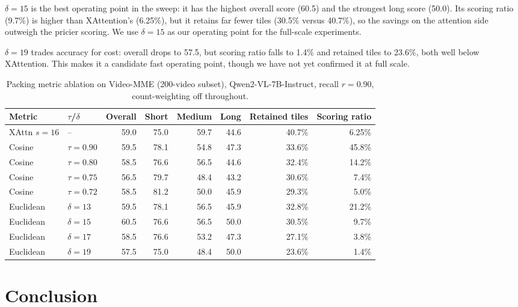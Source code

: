 $\delta{=}15$ is the best operating point in the sweep: it has the highest overall score (60.5) and the strongest long score (50.0). Its scoring ratio (9.7\%) is higher than XAttention's (6.25\%), but it retains far fewer tiles (30.5\% versus 40.7\%), so the savings on the attention side outweigh the pricier scoring. We use $\delta{=}15$ as our operating point for the full-scale experiments.

$\delta{=}19$ trades accuracy for cost: overall drops to 57.5, but scoring ratio falls to 1.4\% and retained tiles to 23.6\%, both well below XAttention. This makes it a candidate fast operating point, though we have not yet confirmed it at full scale.




\begin{table}[!ht]
\centering
\caption{Packing metric ablation on Video-MME (200-video subset), Qwen2-VL-7B-Instruct, recall $r{=}0.90$, count-weighting off throughout.}
\label{tab:videomme_ablation_metric}
\begin{tabular}{llrrrrrr}
\toprule
Metric & $\tau$/$\delta$ & Overall & Short & Medium & Long & Retained tiles & Scoring ratio \\
\midrule
XAttn $s{=}16$ & -- & 59.0 & 75.0 & 59.7 & 44.6 & 40.7\% & 6.25\% \\
\midrule
Cosine & $\tau{=}0.90$ & 59.5 & 78.1 & 54.8 & 47.3 & 33.6\% & 45.8\% \\
Cosine & $\tau{=}0.80$ & 58.5 & 76.6 & 56.5 & 44.6 & 32.4\% & 14.2\% \\
Cosine & $\tau{=}0.75$ & 56.5 & 79.7 & 48.4 & 43.2 & 30.6\% & 7.4\% \\
Cosine & $\tau{=}0.72$ & 58.5 & 81.2 & 50.0 & 45.9 & 29.3\% & 5.0\% \\
\midrule
Euclidean & $\delta{=}13$ & 59.5 & 78.1 & 56.5 & 45.9 & 32.8\% & 21.2\% \\
Euclidean & $\delta{=}15$ & 60.5 & 76.6 & 56.5 & 50.0 & 30.5\% & 9.7\% \\
Euclidean & $\delta{=}17$ & 58.5 & 76.6 & 53.2 & 47.3 & 27.1\% & 3.8\% \\
Euclidean & $\delta{=}19$ & 57.5 & 75.0 & 48.4 & 50.0 & 23.6\% & 1.4\% \\
\bottomrule
\end{tabular}
\end{table}

\section{Conclusion}

